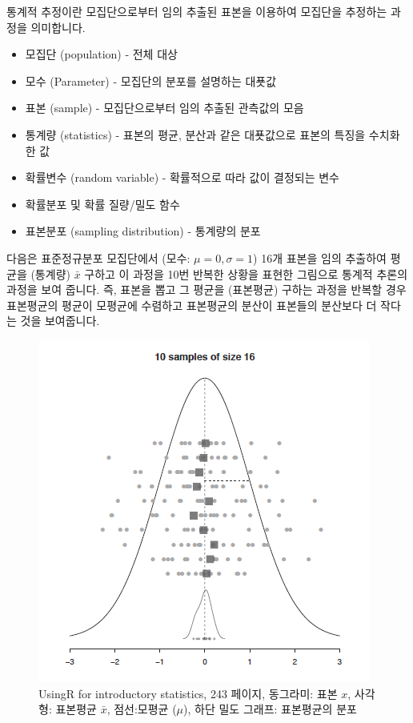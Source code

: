 \documentclass[
]{book}
\providecommand{\tightlist}{%
  \setlength{\itemsep}{0pt}\setlength{\parskip}{0pt}}
\begin{document}
통계적 추정이란 모집단으로부터 임의 추출된 표본을 이용하여 모집단을 추정하는 과정을 의미합니다.

\begin{itemize}
\tightlist
\item
  모집단 (population) - 전체 대상
\item
  모수 (Parameter) - 모집단의 분포를 설명하는 대푯값
\item
  표본 (sample) - 모집단으로부터 임의 추출된 관측값의 모음
\item
  통계량 (statistics) - 표본의 평균, 분산과 같은 대푯값으로 표본의 특징을 수치화한 값
\item
  확률변수 (random variable) - 확률적으로 따라 값이 결정되는 변수
\item
  확률분포 및 확률 질량/밀도 함수\\
\item
  표본분포 (sampling distribution) - 통계량의 분포
\end{itemize}

다음은 표준정규분포 모집단에서 (모수: \(\mu=0, \sigma=1\)) 16개 표본을 임의 추출하여 평균을 (통계량) \(\bar{x}\) 구하고 이 과정을 10번 반복한 상황을 표현한 그림으로 통계적 추론의 과정을 보여 줍니다. 즉, 표본을 뽑고 그 평균을 (표본평균) 구하는 과정을 반복할 경우 표본평균의 평균이 모평균에 수렴하고 표본평균의 분산이 표본들의 분산보다 더 작다는 것을 보여줍니다.

\begin{figure}
\centering
\includegraphics{images/12/01.png}
\caption{UsingR for introductory statistics, 243 페이지, 동그라미: 표본 \(x\), 사각형: 표본평균 \(\bar{x}\), 점선:모평균 (\(\mu\)), 하단 밀도 그래프: 표본평균의 분포}
\end{figure}
\end{document}
